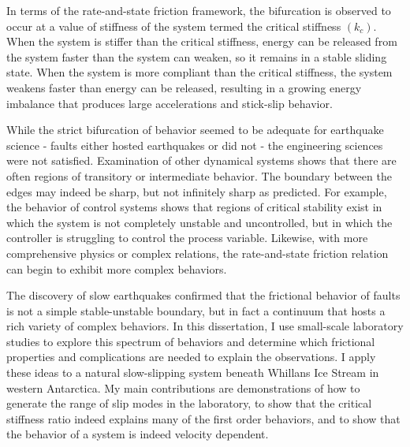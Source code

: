 In terms of the rate-and-state friction framework, the bifurcation is observed to occur at a value of stiffness of the system termed the critical stiffness $(k_c)$. When the system is stiffer than the critical stiffness, energy can be released from the system faster than the system can weaken, so it remains in a stable sliding state. When the system is more compliant than the critical stiffness, the system weakens faster than energy can be released, resulting in a growing energy imbalance that produces large accelerations and stick-slip behavior.  

While the strict bifurcation of behavior seemed to be adequate for earthquake science - faults either hosted earthquakes or did not - the engineering sciences were not satisfied. Examination of other dynamical systems shows that there are often regions of transitory or intermediate behavior. The boundary between the edges may indeed be sharp, but not infinitely sharp as predicted. For example, the behavior of control systems shows that regions of critical stability exist in which the system is not completely unstable and uncontrolled, but in which the controller is struggling to control the process variable. Likewise, with more comprehensive physics or complex relations, the rate-and-state friction relation can begin to exhibit more complex behaviors. 

The discovery of slow earthquakes confirmed that the frictional behavior of faults is not a simple stable-unstable boundary, but in fact a continuum that hosts a rich variety of complex behaviors. In this dissertation, I use small-scale laboratory studies to explore this spectrum of behaviors and determine which frictional properties and complications are needed to explain the observations. I apply these ideas to a natural slow-slipping system beneath Whillans Ice Stream in western Antarctica. My main contributions are demonstrations of how to generate the range of slip modes in the laboratory, to show that the critical stiffness ratio indeed explains many of the first order behaviors, and to show that the behavior of a system is indeed velocity dependent.
